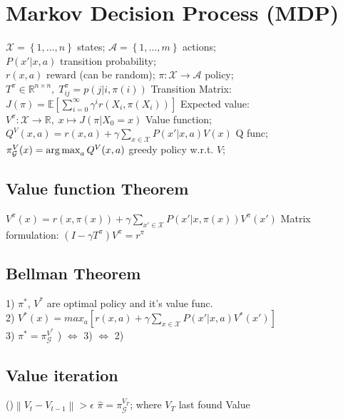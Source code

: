 \section{Markov Decision Process (MDP)}
$\mathcal{X}=\left\{1,\dots,n\right\}$ states; 
$\mathcal{A}=\left\{1,\dots,m\right\}$ actions;\\
$P(x'\vert x, a)$ transition probability;\\
$r(x,a)$ reward {\tiny(can be random)}; 
$\pi:\mathcal{X}\rightarrow\mathcal{A}$ policy;\\
$T^\pi\in\mathbb{R}^{n\times n},\; T^\pi_{ij} = p(j\vert i, \pi(i))$ Transition Matrix:\\
$J(\pi) = \mathbb{E}\left[\sum_{i=0}^{\infty}\gamma^i r(X_i, \pi(X_i))\right]$ Expected value:\\
$V^\pi:\mathcal{X}\rightarrow \mathbb{R},\; x\mapsto J(\pi\vert X_0 = x)$ Value function;\\
$Q^V(x,a) = r(x,a) + \gamma\sum_{x\in\mathcal{X}}P(x'\vert x, a)V(x)$ Q func;\\
$\pi_\mathcal{G}^{V}(x)=\operatorname*{arg\,max}_a Q^V(x,a)$ greedy policy {\scriptsize w.r.t. $V$};

\subsection{Value function Theorem}
$V^\pi(x) = r(x,\pi(x))+\gamma\sum_{x'\in\mathcal{X}}P(x'\vert x, \pi(x))V^\pi(x')$
Matrix formulation: $(I-\gamma T^\pi)V^\pi=r^\pi$

\subsection{Bellman Theorem}
1) $\pi^*$, $V^*$ are optimal policy and it's value func.\\
2) $V^*(x)=max_a\left[r(x,a)+\gamma\sum_{x\in\mathcal{X}}P(x'\vert x, a)V^*(x')\right]$\\
3) $\pi^* = \pi_\mathcal{G}^{V^*}$ \enspace\enspace\enspace\enspace\enspace\enspace\enspace\enspace\enspace\enspace\enspace{}) $\Leftrightarrow$ 3) $\Leftrightarrow$ 2)

\subsection{Value iteration}
    \begin{algorithm}[H]
        \While(){$\left\lVert  V_t - V_{t-1}\right\rVert > \epsilon$}{
        }
        $\hat{\pi} = \pi_\mathcal{G}^{V_T}$; where $V_T$ last found Value
\end{algorithm}

